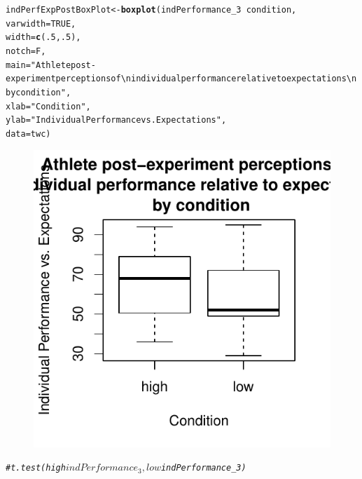 \documentclass[english]{article}\usepackage[]{graphicx}\usepackage[]{color}
\makeatletter
\def\maxwidth{ %
  \ifdim\Gin@nat@width>\linewidth
    \linewidth
  \else
    \Gin@nat@width
  \fi
}
\newcommand{\hlnum}[1]{\textcolor[rgb]{0.686,0.059,0.569}{#1}}%
\newcommand{\hlstr}[1]{\textcolor[rgb]{0.192,0.494,0.8}{#1}}%
\newcommand{\hlcom}[1]{\textcolor[rgb]{0.678,0.584,0.686}{\textit{#1}}}%
\newcommand{\hlopt}[1]{\textcolor[rgb]{0,0,0}{#1}}%
\newcommand{\hlstd}[1]{\textcolor[rgb]{0.345,0.345,0.345}{#1}}%
\newcommand{\hlkwb}[1]{\textcolor[rgb]{0.69,0.353,0.396}{#1}}%
\newcommand{\hlkwc}[1]{\textcolor[rgb]{0.333,0.667,0.333}{#1}}%
\newcommand{\hlkwd}[1]{\textcolor[rgb]{0.737,0.353,0.396}{\textbf{#1}}}%
\newenvironment{kframe}{%
 \def\at@end@of@kframe{}%
 \ifinner\ifhmode%
  \def\at@end@of@kframe{\end{minipage}}%
  \begin{minipage}{\columnwidth}%
 \fi\fi%
 \def\FrameCommand##1{\hskip\@totalleftmargin \hskip-\fboxsep
 \colorbox{shadecolor}{##1}\hskip-\fboxsep
     \hskip-\linewidth \hskip-\@totalleftmargin \hskip\columnwidth}%
 \MakeFramed {\advance\hsize-\width
   \@totalleftmargin\z@ \linewidth\hsize
   \@setminipage}}%
 {\par\unskip\endMakeFramed%
 \at@end@of@kframe}
\newenvironment{knitrout}{}{} %
\makeatother
\begin{document}
\begin{knitrout}
\color{fgcolor}\begin{kframe}
\begin{alltt}
\hlstd{indPerfExpPostBoxPlot} \hlkwb{<-} \hlkwd{boxplot}\hlstd{(indPerformance_3} \hlopt{~} \hlstd{condition,}
                                        \hlkwc{varwidth} \hlstd{=} \hlnum{TRUE}\hlstd{,}
                                        \hlkwc{width} \hlstd{=} \hlkwd{c}\hlstd{(}\hlnum{.5}\hlstd{,}\hlnum{.5}\hlstd{),}
                                        \hlkwc{notch} \hlstd{= F,}
                                        \hlkwc{main} \hlstd{=} \hlstr{"Athlete post-experiment perceptions of \textbackslash{}n individual performance relative to expectations \textbackslash{}n by condition"}\hlstd{,}
                                        \hlkwc{xlab} \hlstd{=} \hlstr{"Condition"}\hlstd{,}
                                        \hlkwc{ylab} \hlstd{=} \hlstr{"Individual Performance vs. Expectations"}\hlstd{,}
                                        \hlkwc{data} \hlstd{= twc)}
\end{alltt}
\end{kframe}\begin{figure}

{\centering \includegraphics[width=\maxwidth]{figure/indPerfExpPostBoxPlot-1} 

}

\end{figure}

\begin{kframe}\begin{alltt}
\hlcom{# t.test(high$indPerformance_3, low$indPerformance_3)}
\end{alltt}
\end{kframe}
\end{knitrout}
\end{document}
